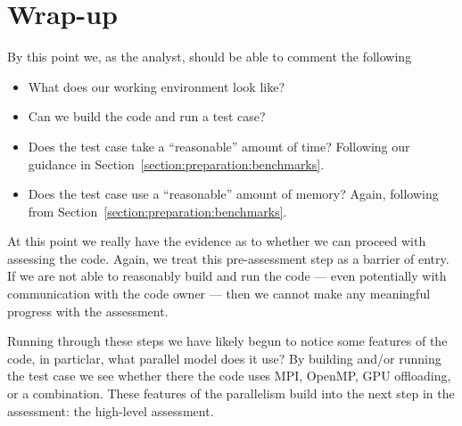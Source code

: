 \section{Wrap-up}
\label{section:preparation:wrapup}

By this point we, as the analyst, should be able to comment the following
\begin{itemize}
  \item What does our working environment look like? 
  \item Can we build the code and run a test case?
  \item Does the test case take a ``reasonable'' amount of time? Following our guidance in Section~\ref{section:preparation:benchmarks}.
  \item Does the test case use a ``reasonable'' amount of memory? Again, following from Section~\ref{section:preparation:benchmarks}.
\end{itemize}

At this point we really have the evidence as to whether we can proceed with assessing the code. Again, we treat this pre-assessment step as a barrier of entry. If we are not able to reasonably build and run the code --- even potentially with communication with the code owner --- then we cannot make any meaningful progress with the assessment.

Running through these steps we have likely begun to notice some features of the code, in particlar, what parallel model does it use? By building and/or running the test case we see whether there the code uses MPI, OpenMP, GPU offloading, or a combination. These features of the parallelism build into the next step in the assessment: the high-level assessment.
